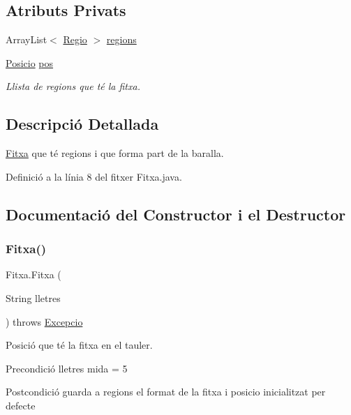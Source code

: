 \subsection*{Atributs Privats}
\begin{DoxyCompactItemize}
\item 
Array\+List$<$ \mbox{\hyperlink{class_regio}{Regio}} $>$ \mbox{\hyperlink{class_fitxa_ad58813fa3873ce12e3c7960058701195}{regions}}
\item 
\mbox{\hyperlink{class_posicio}{Posicio}} \mbox{\hyperlink{class_fitxa_a660ca2f91a04c1ca58020858d58750a5}{pos}}
\begin{DoxyCompactList}\small\item\em Llista de regions que té la fitxa. \end{DoxyCompactList}\end{DoxyCompactItemize}


\subsection{Descripció Detallada}
\mbox{\hyperlink{class_fitxa}{Fitxa}} que té regions i que forma part de la baralla. 

Definició a la línia 8 del fitxer Fitxa.\+java.



\subsection{Documentació del Constructor i el Destructor}
\mbox{\label{class_fitxa_a053ca7bf82da62ef589a1ef08aa835a3}} 
\subsubsection{\texorpdfstring{Fitxa()}{Fitxa()}}
{\footnotesize\ttfamily Fitxa.\+Fitxa (\begin{DoxyParamCaption}\item[{String}]{lletres }\end{DoxyParamCaption}) throws \mbox{\hyperlink{class_excepcio}{Excepcio}}}



Posició que té la fitxa en el tauler. 

\begin{DoxyPrecond}{Precondició}
lletres mida = 5 
\end{DoxyPrecond}
\begin{DoxyPostcond}{Postcondició}
guarda a regions el format de la fitxa i posicio inicialitzat per defecte 
\end{DoxyPostcond}


